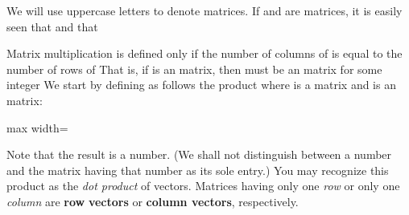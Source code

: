 \documentclass[11pt,oneside]{article}
\begin{document}
\begin{BookBody}
We will use uppercase letters to denote matrices. If  and  are  matrices, it is easily seen that  and that 

Matrix multiplication is defined only if the number of columns of  is equal to the number of rows of  That is, if  is an  matrix, then  must be an  matrix for some integer  We start by defining as follows the product  where  is a  matrix and  is an  matrix:

\begin{center}\begin{adjustbox}{max width=\linewidth}\end{adjustbox}\end{center}

\noindent Note that the result is a number. (We shall not distinguish between a number and the  matrix having that number as its sole entry.) You may recognize this product as the\textit{ dot product} of vectors. Matrices having only one\textit{ row} or only one\textit{ column} are\textbf{ row} \textbf{vectors} or\textbf{ column vectors}, respectively.

\end{BookBody}

\BookNarrativetrue
\end{document}
